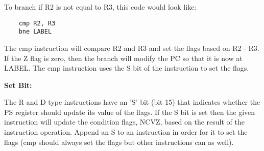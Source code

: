 \documentclass[]{article}
\begin{document}
\noindent To branch if R2 is not equal to R3, this code would look like:
\begin{lstlisting}
	cmp R2, R3
	bne LABEL
\end{lstlisting}
\noindent The cmp instruction will compare R2 and R3 and set the flags based on R2 - R3.  If the Z flag is zero, then the branch will modify the PC so that it is now at LABEL.  The cmp instruction uses the S bit of the instruction to set the flags.
\newline\newline

{\Large
	\textbf{
		Set Bit:
	}
}

\noindent The R and D type instructions have an 'S' bit (bit 15) that indicates whether the PS register should update its value of the flags.  If the S bit is set then the given instruction will update the condition flags, NCVZ, based on the result of the instruction operation.  Append an S to an instruction in order for it to set the flags (cmp should always set the flags but other instructions can as well).

\pagebreak
\end{document}
